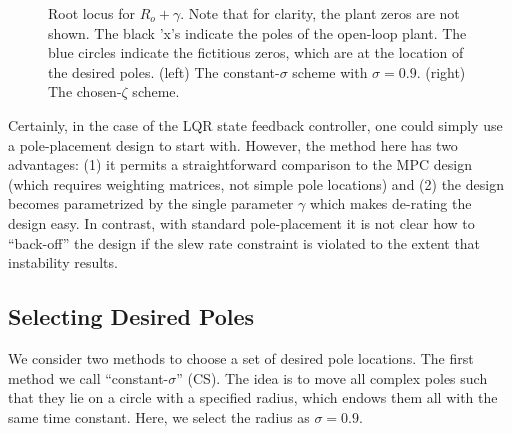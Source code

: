 \documentclass[twocolumn,twoside]{IEEEtran}
\begin{document}
\begin{figure*}
    \begin{subfigure}{0.48\textwidth}
  
\caption{}
  \label{fig:lqr_locus_cs}
\end{subfigure}
\hfill
\begin{subfigure}{0.48\textwidth}
  
  \caption{}
  \label{fig:lqr_locus_cz}
\end{subfigure}
\caption{Root locus for $R_o + \gamma$. Note that for clarity, the plant zeros are not shown. The black 'x's indicate the poles of the open-loop plant. The blue circles indicate the fictitious zeros, which are at the location of the desired poles. (left) The constant-$\sigma$ scheme with $\sigma=0.9$. (right) The chosen-$\zeta$ scheme.}
\label{fig:lqr_locus}
\end{figure*}

Certainly, in the case of the LQR state feedback controller, one could simply use a pole-placement design to start with. However, the method here has two advantages: (1) it permits a straightforward comparison to the MPC design (which requires weighting matrices, not simple pole locations) and (2) the design becomes parametrized by the single parameter $\gamma$ which makes de-rating the design easy. In contrast, with standard pole-placement it is not clear how to ``back-off'' the design if the slew rate constraint is violated to the extent that instability results. 


\subsection{Selecting Desired Poles}
We consider two methods to choose a set of desired pole locations. The first method we call ``constant-$\sigma$'' (CS). The idea is to move all complex poles such that they lie on a circle with a specified radius, which endows them all with the same time constant. Here, we select the radius as $\sigma=0.9$.
\end{document}
